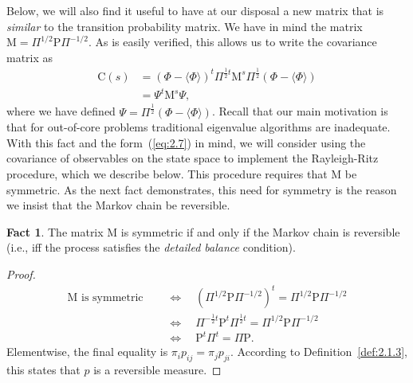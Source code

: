 \documentclass[12pt,letterpaper]{report}
\theoremstyle{plain}
\theoremstyle{definition}
\newtheorem*{fact}{Fact}
\theoremstyle{remark}
\numberwithin{theorem}{chapter}
\numberwithin{claim}{chapter}
\numberwithin{equation}{chapter}
\numberwithin{conjecture}{chapter}
\newcommand\C{\ensuremath{\mathrm{C}}}
\renewcommand\P{\ensuremath{\mathrm{P}}}
\newcommand\M{\ensuremath{\mathrm{M}}}
\newcommand\pij{\ensuremath{p_{ij}}}
\newcommand\pji{\ensuremath{p_{ji}}}
\newcommand\<{\ensuremath{\langle}}
\renewcommand\>{\ensuremath{\rangle}}
\begin{document}
Below, we will also find it useful to have at our disposal a new matrix that is \emph{similar} to the
transition probability matrix. We have in mind the matrix 
$\M = \Pi^{1/2}\P\Pi^{-1/2}$. 
As is easily verified, this allows us to write the covariance matrix as
\begin{align}
\label{eq:2.7}
\C(s) &= 
(\Phi - \<\Phi\>)^t \Pi^{\frac{1}{2}t}\M^s\Pi^{\frac{1}{2}}(\Phi - \<\Phi\>)\nonumber\\
&=\Psi^t \M^s \Psi,  %
\end{align}
where we have defined $\Psi = \Pi^{\frac{1}{2}}(\Phi - \<\Phi\>)$. Recall that
our main motivation is that for out-of-core problems traditional eigenvalue
algorithms are inadequate. With this fact and the form~(\ref{eq:2.7}) %
in 
%
%
%
%
mind, we will consider using the covariance of observables on the state space to implement the
Rayleigh-Ritz procedure, which we describe below. This procedure requires
that $\M$ be symmetric. As the next fact demonstrates, 
this need for symmetry is the reason we insist that the Markov chain be reversible.
\begin{fact}
The matrix $\M$ is symmetric if and only if the Markov chain is reversible (i.e., iff the
process satisfies the \emph{detailed balance} condition).
\end{fact}
\begin{proof}
  \begin{align*}
  \M \text{ is symmetric } 
& \quad \Longleftrightarrow  \quad
 (\Pi^{1/2}\P\Pi^{-1/2})^t = \Pi^{1/2}\P\Pi^{-1/2}\\
& \quad \Longleftrightarrow  \quad
 \Pi^{-\frac{1}{2}t}\P^t\Pi^{\frac{1}{2}t} = \Pi^{1/2}\P\Pi^{-1/2}\\
& \quad \Longleftrightarrow  \quad
 \P^t\Pi^t = \Pi\P.
  \end{align*}
Elementwise, the final equality is $\pi_i\pij = \pi_j\pji$. 
According to Definition~\ref{def:2.1.3}, this states
that $p$ is a reversible measure.
\end{proof}


\end{document}
